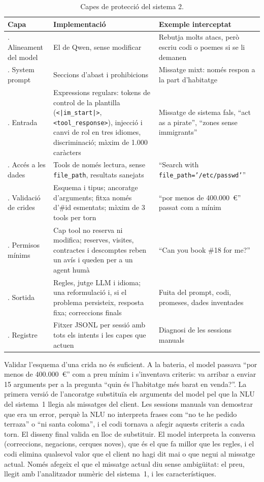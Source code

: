\documentclass[10pt,a4paper]{article}
\begin{document}
\begin{table}[ht]
\centering\small
\caption{Capes de protecció del sistema 2.}
\label{tab:capes}
\begin{tabularx}{\textwidth}{@{}>{\raggedright\arraybackslash}p{2.9cm}L>{\raggedright\arraybackslash}p{4.3cm}@{}}
\toprule
Capa & Implementació & Exemple interceptat \\
. Alineament del model & El de Qwen, sense modificar & Rebutja molts atacs, però escriu codi o poemes si se li demanen \\
. System prompt & Seccions d'abast i prohibicions & Missatge mixt: només respon a la part d'habitatge \\
. Entrada & Expressions regulars: tokens de control de la plantilla (\texttt{<|im\_start|>}, \texttt{<tool\_response>}), injecció i canvi de rol en tres idiomes, discriminació; màxim de 1.000 caràcters & Missatge de sistema fals, ``act as a pirate'', ``zones sense immigrants'' \\
. Accés a les dades & Tools de només lectura, sense \texttt{file\_path}, resultats sanejats & ``Search with \texttt{file\_path='/etc/passwd'}'' \\
. Validació de crides & Esquema i tipus; ancoratge d'arguments; fitxa només d'\#id esmentats; màxim de 3 tools per torn & ``por menos de 400.000~€'' passat com a mínim \\
. Permisos mínims & Cap tool no reserva ni modifica; reserves, visites, contractes i descomptes reben un avís i queden per a un agent humà & ``Can you book \#18 for me?'' \\
. Sortida & Regles, jutge LLM i idioma; una reformulació i, si el problema persisteix, resposta fixa; correccions finals & Fuita del prompt, codi, promeses, dades inventades \\
. Registre & Fitxer JSONL per sessió amb tots els intents i les capes que actuen & Diagnosi de les sessions manuals \\
\bottomrule
\end{tabularx}
\end{table}

Validar l'esquema d'una crida no és suficient. A la bateria, el model passava ``por menos de 400.000~€'' com a preu mínim i s'inventava criteris: va arribar a enviar 15 arguments per a la pregunta ``quin és l'habitatge més barat en venda?''. La primera versió de l'ancoratge substituïa els arguments del model pel que la NLU del sistema~1 llegia als missatges del client. Les sessions manuals van demostrar que era un error, perquè la NLU no interpreta frases com ``no te he pedido terraza'' o ``ni santa coloma'', i el codi tornava a afegir aquests criteris a cada torn. El disseny final valida en lloc de substituir. El model interpreta la conversa (correccions, negacions, cerques noves), que és el que fa millor que les regles, i el codi elimina qualsevol valor que el client no hagi dit mai o que negui al missatge actual. Només afegeix el que el missatge actual diu sense ambigüitat: el preu, llegit amb l'analitzador numèric del sistema~1, i les característiques.
\end{document}

